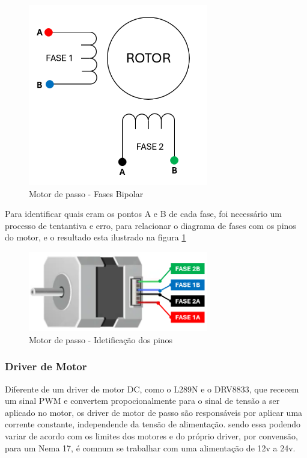 \begin{figure}[htb]
	\centering
	\includegraphics[width=0.7\textwidth]{figures/motor_wiring}
	\caption{Motor de passo - Fases Bipolar \cite{motor_dc_6v_encoder}}
\end{figure}

Para identificar quais eram os pontos A e B de cada fase, foi necessário um processo de tentantiva e erro,
para relacionar o diagrama de fases com os pinos do motor, e o resultado esta ilustrado na figura \ref{nema_pinout}

\begin{figure}[htb]
	\centering
	\includegraphics[width=0.7\textwidth]{figures/motor_pinout}
	\caption{Motor de passo - Idetificação dos pinos  \cite{motor_dc_6v_encoder}}
	\label{nema_pinout}
\end{figure}



\subsubsection{Driver de Motor}

Diferente de um driver de motor DC, como o L289N e o DRV8833, que rececem um sinal PWM e convertem propocionalmente
para o sinal de tensão a ser aplicado no motor,  os driver de motor de passo são responsáveis por aplicar uma corrente constante, independende da tensão de alimentação.
sendo essa podendo variar de acordo com os limites dos motores e do próprio driver,  por convensão, para um Nema 17, é comnum se trabalhar com uma alimentação
de 12v a 24v.

